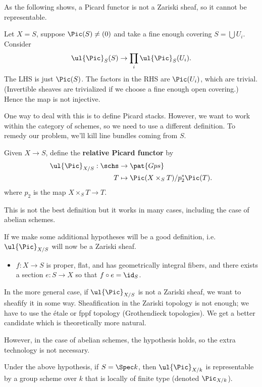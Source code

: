 As the following shows, a Picard functor is not a Zariski sheaf, so it cannot be representable.

\begin{ex}
Let $X=S$, suppose $\Pic(S)\ne (0)$ and take a fine enough covering $S=\bigcup U_i$. Consider
\[
\ul{\Pic}_S(S)\to \prod_i \ul{\Pic}_S(U_i).
\]
The LHS is just $\Pic(S)$. The factors in the RHS are $\Pic(U_i)$, which are trivial. 
(Invertible sheaves are trivialized if we choose a fine enough open covering.) Hence the map is not injective. %
\end{ex}
One way to deal with this is to define Picard stacks. However, we want to work within the category of schemes, so we need to use a different definition. To remedy our problem, we'll kill line bundles coming from $S$. %
\begin{df}
Given $X\to S$, define the \textbf{relative Picard functor} by 
\begin{align*}
\ul{\Pic}_{X/S}: \schs &\to \pat{Gps}\\
T&\mapsto \Pic(X\times_ST)/p_2^*\Pic(T).
\end{align*}%
where $p_2$ is the map $X\times_ST\to T$.
\end{df}
This is not the best definition but it works in many cases, including the case of abelian schemes.

If we make some additional hypotheses will be a good definition, i.e. $\ul{\Pic}_{X/S}$ will now be a Zariski sheaf.
\begin{itemize}
\item
$f:X\to S$ is proper, flat, and has geometrically integral fibers, and there exists a section $e:S\to X$ so that $f\circ e=\id_S$.
\end{itemize}
In the more general case, if $\ul{\Pic}_{X/S}$ is not a Zariski sheaf, we want to sheafify it in some way. Sheafification in the Zariski topology is not enough; we have to use the 
\'etale or fppf topology (Grothendieck topologies). We get a better candidate which is theoretically more natural. 

However, in the case of abelian schemes, the hypothesis holds, so the extra technology is not necessary.

\begin{thm}
Under the above hypothesis, if $S=\Spec k$, then $\ul{\Pic}_{X/k}$ is representable by a group scheme over $k$ that is locally of finite type (denoted $\Pic_{X/k}$).
\end{thm}

